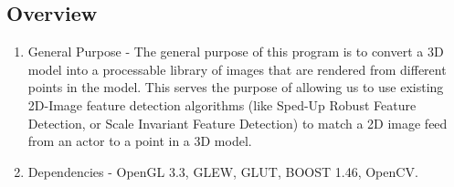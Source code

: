 \documentclass[a4paper,11pt]{article}
\begin{document}
        \subsection{Overview}
        \begin{enumerate}
        \item General Purpose - The general purpose of this program is to convert a 3D model into a processable library of images that are rendered from 
        different points in the model. This serves the purpose of allowing us to use existing 2D-Image feature detection algorithms 
        (like Sped-Up Robust Feature Detection, or Scale Invariant Feature Detection) to match a 2D image feed from an actor to a point in a 3D model.
        \item Dependencies - OpenGL 3.3, GLEW, GLUT, BOOST 1.46, OpenCV.
        \end{enumerate}
        
\end{document}
